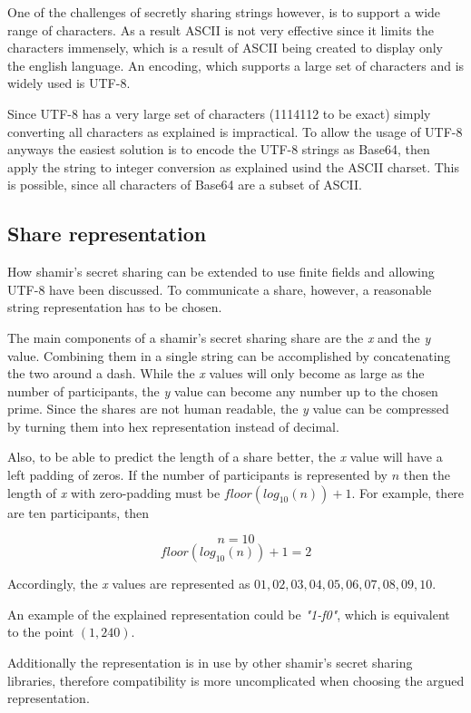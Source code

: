 One of the challenges of secretly sharing strings however, is to support a wide
range of characters. As a result ASCII is not very effective since it limits
the characters immensely, which is a result of ASCII being created to display
only the english language. An encoding, which supports a large set of
characters and is widely used is UTF-8.

Since UTF-8 has a very large set of characters (1114112 to be exact) simply
converting all characters as explained is impractical. To allow the usage of
UTF-8 anyways the easiest solution is to encode the UTF-8 strings as Base64,
then apply the string to integer conversion as explained usind the ASCII
charset. This is possible, since all characters of Base64 are a subset of
ASCII.

\subsection{Share representation}

How shamir's secret sharing can be extended to use finite fields and allowing
UTF-8 have been discussed. To communicate a share, however, a reasonable string
representation has to be chosen.

The main components of a shamir's secret sharing share are the \textit{x} and
the \textit{y} value. Combining them in a single string can be accomplished by
concatenating the two around a dash. While the \textit{x} values will only
become as large as the number of participants, the \textit{y} value can become
any number up to the chosen prime. Since the shares are not human readable,
the \textit{y} value can be compressed by turning them into hex representation
instead of decimal.

Also, to be able to predict the length of a share better, the \textit{x} value
will have a left padding of zeros. If the number of participants is represented
by $n$ then the length of \textit{x} with zero-padding must be
$floor(log_{10}(n))+1$. For example, there are ten participants, then

$$n = 10$$
$$floor(log_{10}(n))+1 = 2$$

Accordingly, the \textit{x} values are represented as $01, 02, 03, 04, 05, 06,
07, 08, 09, 10$.

An example of the explained representation could be \textit{"1-f0"}, which is
equivalent to the point $(1, 240)$.

Additionally the representation is in use by other shamir's secret sharing
libraries, therefore compatibility is more uncomplicated when choosing the
argued representation.


